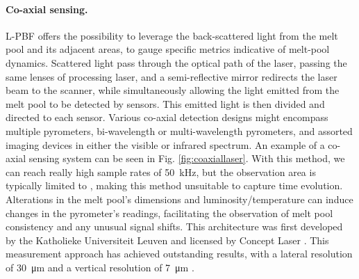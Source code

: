 \paragraph{Co-axial sensing.} L-PBF offers the possibility to leverage the back-scattered light from the melt pool and its adjacent areas, to gauge specific metrics indicative of melt-pool dynamics. Scattered light pass through the optical path of the laser, passing the same lenses of processing laser, and a semi-reflective mirror redirects the laser beam to the scanner, while simultaneously allowing the light emitted from the melt pool to be detected by sensors. This emitted light is then divided and directed to each sensor. Various co-axial detection designs might encompass multiple pyrometers, bi-wavelength or multi-wavelength pyrometers, and assorted imaging devices in either the visible or infrared spectrum. An example of a co-axial sensing system can be seen in Fig. \ref{fig:coaxiallaser}. With this method, we can reach really high sample rates of \SI{50}{\kilo\hertz}, but the observation area is typically limited to , making this method unsuitable to capture time evolution. Alterations in the melt pool's dimensions and luminosity/temperature can induce changes in the pyrometer's readings, facilitating the observation of melt pool consistency and any unusual signal shifts. This architecture was first developed by the Katholieke Universiteit Leuven and licensed by Concept Laser \cite{colosimo_-machine_2020, kruth_jean-pierre_feedback_2007, berumen_quality_2010}. This measurement approach has achieved outstanding results, with a lateral resolution of \SI{30}{\micro\metre} and a vertical resolution of \SI{7}{\micro\metre} \cite{fleming_tracking_2020}.
